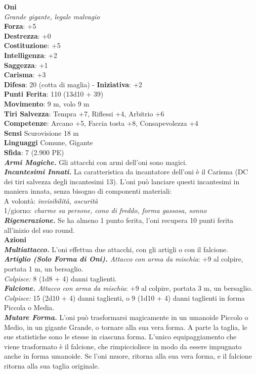 \begin{multicols}{2}
\medskip\textbf{Oni}\\
\emph{Grande gigante, legale malvagio}\\
\textbf{Forza}: +5\\
\textbf{Destrezza}: +0\\
\textbf{Costituzione}: +5\\
\textbf{Intelligenza}: +2\\
\textbf{Saggezza}: +1\\
\textbf{Carisma}: +3\\
\textbf{Difesa}: 20 (cotta di maglia) - \textbf{Iniziativa}: +2\\
\textbf{Punti Ferita}: 110 (13d10 + 39)\\
\textbf{Movimento}: 9 m, volo 9 m  \\
\textbf{Tiri Salvezza}: Tempra +7, Riflessi +4, Arbitrio +6\\
\textbf{Competenze}: Arcano +5, Faccia tosta +8, Consapevolezza +4\\
\textbf{Sensi} Scurovisione 18 m\\
\textbf{Linguaggi} Comune, Gigante\\
\textbf{Sfida}: 7 (2.900 PE)\smallskip\\
\emph{\textbf{Armi Magiche.}} Gli attacchi con armi dell'oni sono magici.\\
\emph{\textbf{Incantesimi Innati.}} La caratteristica da incantatore dell'oni è il Carisma (DC dei tiri salvezza degli incantesimi 13). L'oni può lanciare questi incantesimi in maniera innata, senza bisogno di componenti materiali:\\
A volontà: \emph{invisibilità, oscurità}\\
1/giorno: \emph{charme su persone, cono di freddo, forma gassosa,} \emph{sonno}\\
\emph{\textbf{Rigenerazione.}} Se ha almeno 1 punto ferita, l'oni recupera 10 punti ferita all'inizio del suo round.\\
\smallskip\textbf{Azioni}\\
\emph{\textbf{Multiattacco.}} L'oni effettua due attacchi, con gli artigli o con il falcione.\\
\emph{\textbf{Artiglio (Solo Forma di Oni).} Attacco con arma da mischia}: +9 al colpire, portata 1 m, un bersaglio.\\
\emph{Colpisce:} 8 (1d8 + 4) danni taglienti.\\
\emph{\textbf{Falcione.} Attacco con arma da mischia}: +9 al colpire, portata 3 m, un bersaglio.\\
\emph{Colpisce:} 15 (2d10 + 4) danni taglienti, o 9 (1d10 + 4) danni taglienti in forma Piccola o Media.\\
\emph{\textbf{Mutare Forma.}} L'oni può trasformarsi magicamente in un umanoide Piccolo o Medio, in un gigante Grande, o tornare alla sua vera forma. A parte la taglia, le sue statistiche sono le stesse in ciascuna forma. L'unico equipaggiamento che viene trasformato è il falcione, che rimpicciolisce in modo da essere impugnato anche in forma umanoide. Se l'oni muore, ritorna alla sua vera forma, e il falcione ritorna alla sua taglia originale.\\


\end{multicols}
